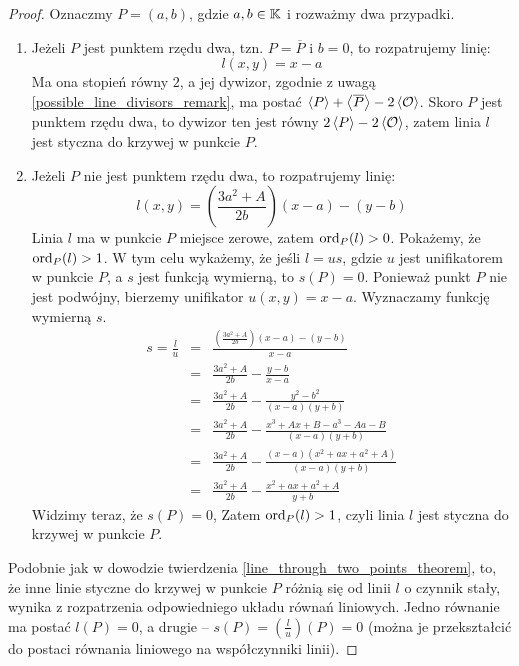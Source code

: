 \begin{proof}
Oznaczmy $P = (a, b)$, gdzie $a, b \in \mathbb{K}$
i rozważmy dwa przypadki.
\begin{enumerate}
\item
Jeżeli $P$ jest punktem rzędu dwa, tzn. $P = \overline{P}$ i $b = 0$,
to rozpatrujemy linię:
\begin{equation}
l(x, y) = x - a
\end{equation}
Ma ona stopień równy $2$,
a jej dywizor, zgodnie z uwagą \ref{possible_line_divisors_remark},
ma postać $\left\langle P\right\rangle + \left\langle\overline{P}\right\rangle - 2\left\langle\mathcal{O}\right\rangle$.
Skoro $P$ jest punktem rzędu dwa, to dywizor ten jest równy
$2\left\langle P\right\rangle - 2\left\langle\mathcal{O}\right\rangle$,
zatem linia $l$ jest styczna do krzywej w punkcie $P$.
\item
Jeżeli $P$ nie jest punktem rzędu dwa,
to rozpatrujemy linię:
\begin{equation}
l(x, y) = \left(\frac{3a^2 + A}{2b}\right)(x - a) - (y - b)
\end{equation}
Linia $l$ ma w punkcie $P$ miejsce zerowe, zatem $\operatorname{ord}_P(l) > 0$.
Pokażemy, że $\operatorname{ord}_P(l) > 1$.
W tym celu wykażemy, że jeśli $l = us$,
gdzie $u$ jest unifikatorem w punkcie $P$,
a $s$ jest funkcją wymierną,
to $s(P) = 0$.
Ponieważ punkt $P$ nie jest podwójny,
bierzemy unifikator $u(x, y) = x - a$.
Wyznaczamy funkcję wymierną $s$.
\begin{eqnarray*}
s = \frac{l}{u}
& = & \frac{\left(\frac{3a^2+A}{2b}\right)(x-a) - (y-b)}{x-a} \\
& = & \frac{3a^2+A}{2b} - \frac{y-b}{x-a} \\
& = & \frac{3a^2+A}{2b} - \frac{y^2-b^2}{(x-a)(y+b)} \\
& = & \frac{3a^2+A}{2b} - \frac{x^3+Ax+B - a^3-Aa-B}{(x-a)(y+b)} \\
& = & \frac{3a^2+A}{2b} - \frac{(x-a)(x^2+ax+a^2+A)}{(x-a)(y+b)} \\
& = & \frac{3a^2+A}{2b} - \frac{x^2+ax+a^2+A}{y+b}
\end{eqnarray*}
Widzimy teraz, że $s(P) = 0$,
Zatem $\operatorname{ord}_P(l) > 1$, czyli linia $l$ jest styczna do krzywej w punkcie $P$.
\end{enumerate}

\noindent
Podobnie jak w dowodzie twierdzenia \ref{line_through_two_points_theorem},
to, że inne linie styczne do krzywej w punkcie $P$ różnią się od linii $l$
o czynnik stały, wynika z rozpatrzenia odpowiedniego układu równań liniowych.
Jedno równanie ma postać $l(P) = 0$, a drugie --
$s(P) = (\frac{l}{u})(P) = 0$
(można je przekształcić do postaci równania liniowego na współczynniki linii).
\end{proof}

